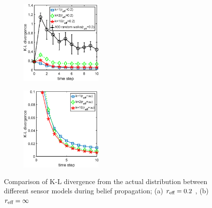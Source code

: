 \documentclass[letterpaper, 10 pt, conference]{ieeeconf}
\begin{document}
\begin{figure}
	\centering
	\begin{subfigure}[b]{0.23\textwidth}
		\centering
		\includegraphics[width=1.6in]{figure/kl_div_2_n}
		\caption{}
	\end{subfigure}
	\begin{subfigure}[b]{0.23\textwidth}
		\centering
		\includegraphics[width=1.6in]{figure/kl_div_1_n}
		\caption{}
	\end{subfigure}
	\caption{Comparison of K-L divergence from the actual distribution between different sensor models during belief propagation; (a) $r_{\textup{eff}} =0.2$ , (b) $r_{\textup{eff}}=\infty$}
	\label{fig:fig5}
\end{figure}
\end{document}
